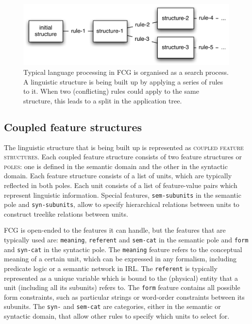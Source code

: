 \begin{figure}
  \begin{center}
    \includegraphics[width=.75\textwidth]{./frameworks/figures/fcg-search.pdf}
    \caption[Application of a rule-set]{Typical language processing in
      FCG is organised as a search process. A linguistic structure is
      being built up by applying a series of rules to it. When two
      (conflicting) rules could apply to the same structure, this
      leads to a split in the application tree.}
    \label{f:fcg-search}
  \end{center}
\end{figure}

\subsection{Coupled feature structures}
\label{s:coupled-feature-structures}

The linguistic structure that is being built up is represented as
\textsc{coupled feature structures}. Each coupled feature structure
consists of two feature structures or \textsc{poles}: one is defined in
the semantic domain and the other in the syntactic domain. Each
feature structure consists of a list of units, which are typically
reflected in both poles. Each unit consists of a list of feature-value
pairs which represent linguistic information. Special features,
{\footnotesize\tt sem-subunits} in the semantic pole and {\footnotesize\tt syn-subunits},
allow to specify hierarchical relations between units to construct
treelike relations between units.

FCG is open-ended to the features it can handle, but the features that
are typically used are: {\footnotesize\tt meaning}, {\footnotesize\tt referent} and
{\footnotesize\tt sem-cat} in the semantic pole and {\footnotesize\tt form} and {\footnotesize\tt syn-cat}
in the syntactic pole. The {\footnotesize\tt meaning} feature refers to the
conceptual meaning of a certain unit, which can be expressed in any
formalism, including predicate logic or a semantic network in IRL. The
{\footnotesize\tt referent} is typically represented as a unique variable which is
bound to the (physical) entity that a unit (including all its
subunits) refers to. The {\footnotesize\tt form} feature contains all possible form
constraints, such as particular strings or word-order constraints
between its subunits. The {\footnotesize\tt syn-} and {\footnotesize\tt sem-cat} are
categories, either in the semantic or syntactic domain, that allow
other rules to specify which units to select for.

